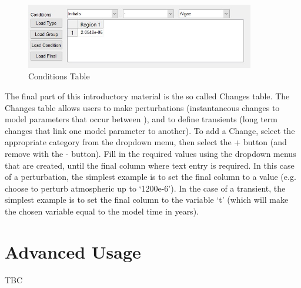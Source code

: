\documentclass[12pt,twoside,onecolumn,a4paper]{article}
\begin{document}
\begin{figure}[H]
\centering
\includegraphics[width=10cm]{./Figures/Conditions_Table.jpg}
\caption{Conditions Table}
\end{figure}

The final part of this introductory material is the so called Changes table. The Changes table allows users to make perturbations (instantaneous changes to model parameters that occur between \Chunks), and to define transients (long term changes that link one model parameter to another). To add a Change, select the appropriate category from the dropdown menu, then select the + button (and remove with the - button). Fill in the required values using the dropdown menus that are created, until the final column where text entry is required. In this case of a perturbation, the simplest example is to set the final column to a value (e.g. choose to perturb atmospheric \COTwo up to `1200e-6'). In the case of a transient, the simplest example is to set the final column to the variable `t' (which will make the chosen variable equal to the model time in years).


\section{Advanced Usage}
TBC
\end{document}
